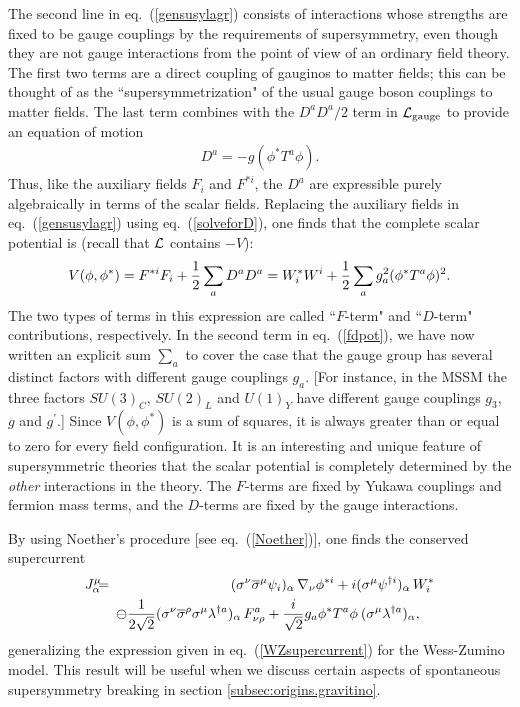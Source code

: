 \documentclass[11pt]{article}
\def\BDplus{+}
\def\BDplus{-}
\def\BDplus{\oplus}
\def\BDplus{\ominus}
\def\beq{\begin{eqnarray}}
\def\eeq{\end{eqnarray}}
\def\lagr{{\cal L}}
\def\sigmabar{\overline\sigma}
\def\half{{1\over 2}}
\begin{document}
The second line in eq.~(\ref{gensusylagr}) consists of interactions whose
strengths are fixed to be gauge couplings by the requirements of
supersymmetry, even though they are not gauge interactions from the point
of view of an ordinary field theory. The first two terms are a direct
coupling of gauginos to matter fields; this can be thought of as the
``supersymmetrization" of the usual gauge boson couplings to matter fields.
The last term combines with the $D^a D^a/2$ term in $\lagr_{\rm gauge}$ to
provide an equation of motion
\beq
D^a = -g (\phi^* T^a \phi ).
\label{solveforD}
\eeq
Thus, like the auxiliary fields $F_i$ and $F^{*i}$, the $D^a$ are
expressible purely algebraically in terms of the scalar fields. Replacing
the auxiliary fields in eq.~(\ref{gensusylagr}) using
eq.~(\ref{solveforD}), one finds that the complete scalar potential is
(recall that $\lagr$ contains $-V$): 
\beq
V(\phi,\phi^*) = F^{*i} F_i + \half \sum_a D^a D^a = W_i^* W^i +
\half \sum_a g_a^2 (\phi^* T^a \phi)^2.
\label{fdpot}
\eeq
The two types of terms in this expression are called ``$F$-term" and
``$D$-term" contributions, respectively. In the second term in
eq.~(\ref{fdpot}), we have now written an explicit sum $\sum_a$ to cover
the case that the gauge group has several distinct factors with different
gauge couplings $g_a$. [For instance, in the MSSM the three factors
$SU(3)_C$, $SU(2)_L$ and $U(1)_Y$ have different gauge couplings $g_3$,
$g$ and $g^\prime$.] Since $V(\phi,\phi^*)$ is a sum of squares, it is
always greater than or equal to zero for every field configuration. It is
an interesting and unique feature of supersymmetric theories that the
scalar potential is completely determined by the {\it other} interactions
in the theory. The $F$-terms are fixed by Yukawa couplings and fermion
mass terms, and the $D$-terms are fixed by the gauge interactions.

By using Noether's procedure [see eq.~(\ref{Noether})], one finds the
conserved supercurrent
\beq
J_\alpha^\mu &\!\!\!=\!\!\!&
(\sigma^\nu\sigmabar^\mu \psi_i)_\alpha\, \nabla_\nu \phi^{*i}
+ i (\sigma^\mu \psi^{\dagger i})_\alpha\, W_i^*
\nonumber
\\ &&
\BDplus {1\over 2 \sqrt{2}}
(\sigma^\nu \sigmabar^\rho \sigma^\mu
\lambda^{\dagger a})_\alpha\, F^a_{\nu\rho}
+ {i\over {\sqrt{2}}} g_a \phi^* T^a \phi
\> (\sigma^\mu \lambda^{\dagger a})_\alpha , \>\>\>\>{}
\label{supercurrent}
\eeq
generalizing the expression given in eq.~(\ref{WZsupercurrent}) for the
Wess-Zumino model. This result will be useful when we discuss certain
aspects of spontaneous supersymmetry breaking in section
\ref{subsec:origins.gravitino}.
\end{document}

